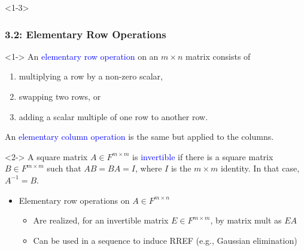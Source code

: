 \documentclass[10pt,english,aspectratio=169]{beamer}
\begin{document}
\begin{frame}

\end{frame}

\begin{frame}<1-3> \frametitle{3.2: Elementary Row Operations}

\vspace{-1.5mm}

\begin{definition}<1->
An \textcolor{blue}{elementary row operation} on an $m \times n$ matrix consists of
\begin{enumerate}
\setlength\itemsep{0.5mm}
\item multiplying a row by a non-zero scalar,
\item swapping two rows, or
\item adding a scalar multiple of one row to another row.
\end{enumerate}
An \textcolor{blue}{elementary column operation} is the same but applied to the columns.
\end{definition}


\begin{definition}<2->
A square matrix $A \in F^{m\times m}$ is \textcolor{blue}{invertible} if there is a square matrix $B \in F^{m\times m}$ such that $AB=BA=I$, where $I$ is the $m\!\times\! m$ identity.  In that case, $A^{-1}=B$.
\end{definition}

\vspace{1mm}
\begin{itemize}
  \item<3-> Elementary row operations on $A\in F^{m\times n}$ \vspace{1mm}
  \begin{itemize}
    \setlength{\itemsep}{1.5mm}
    \item <3-> Are realized, for an invertible matrix $E \in F^{m\times m}$, by matrix mult as $EA$
    \item <3-> Can be used in a sequence to induce RREF (e.g., Gaussian elimination)
  \end{itemize}
\end{itemize}


\end{frame}
\end{document}
